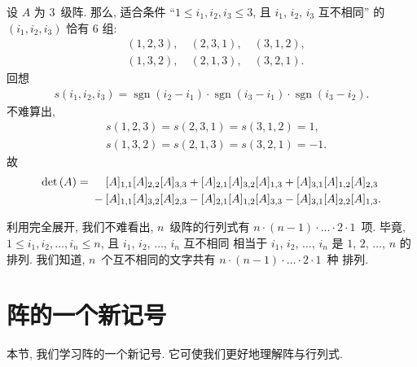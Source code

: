 \begin{example}
    设 \(A\) 为 \(3\)~级阵.
    那么, 适合条件
    ``\(1 \leq i_1, i_2, i_3 \leq 3\),
    且 \(i_1\), \(i_2\), \(i_3\) 互不相同'' 的
    \((i_1, i_2, i_3)\) 恰有 \(6\) 组:
    \begin{align*}
         & (1, 2, 3), \quad (2, 3, 1), \quad (3, 1, 2), \\
         & (1, 3, 2), \quad (2, 1, 3), \quad (3, 2, 1).
    \end{align*}
    回想
    \begin{align*}
        s(i_1, i_2, i_3)
        = \operatorname{sgn} {(i_2 - i_1)}
        \cdot \operatorname{sgn} {(i_3 - i_1)}
        \cdot \operatorname{sgn} {(i_3 - i_2)}.
    \end{align*}
    不难算出,
    \begin{align*}
         & s(1, 2, 3) = s(2, 3, 1) = s(3, 1, 2) = 1,  \\
         & s(1, 3, 2) = s(2, 1, 3) = s(3, 2, 1) = -1.
    \end{align*}
    故
    \begin{align*}
        \det {(A)}
        = {} &
        \hphantom{{} + {}}
        [A]_{1,1} [A]_{2,2} [A]_{3,3}
        + [A]_{2,1} [A]_{3,2} [A]_{1,3}
        + [A]_{3,1} [A]_{1,2} [A]_{2,3}
        \\
             &
        - [A]_{1,1} [A]_{3,2} [A]_{2,3}
        - [A]_{2,1} [A]_{1,2} [A]_{3,3}
        - [A]_{3,1} [A]_{2,2} [A]_{1,3}.
    \end{align*}
\end{example}

利用完全展开,
我们不难看出,
\(n\)~级阵的行列式有
\(n \cdot (n - 1) \cdot \dots \cdot 2 \cdot 1\)~项.
毕竟, \(1 \leq i_1, i_2, \dots, i_n \leq n\),
且 \(i_1\), \(i_2\), \(\dots\), \(i_n\) 互不相同%
相当于 \(i_1\), \(i_2\), \(\dots\), \(i_n\)
是 \(1\), \(2\), \(\dots\), \(n\) 的排列.
我们知道, \(n\)~个互不相同的文字共有
\(n \cdot (n - 1) \cdot \dots \cdot 2 \cdot 1\)~种%
排列.



\section{阵的一个新记号}

本节, 我们学习阵的一个新记号.
它可使我们更好地理解阵与行列式.


